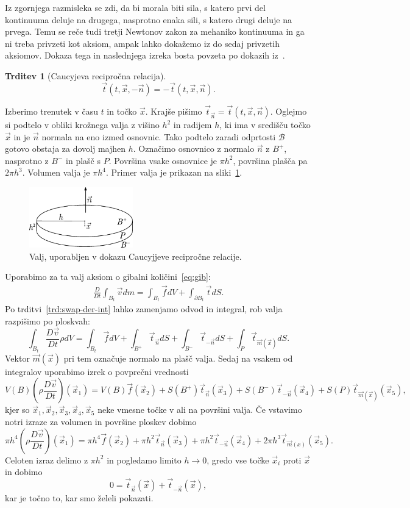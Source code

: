 \documentclass[a4paper,twoside]{article}
\theoremstyle{definition} %
\theoremstyle{plain} %
\newtheorem{trditev}[definicija]{Trditev}
\numberwithin{equation}{section}
\newcommand{\B}{\mathcal{B}}
\newcommand{\DD}[2]{\ensuremath{\frac{D #1}{D #2}}}
\newcommand{\DDt}[1]{\DD{#1}{t}}
\newcommand{\vv}{\vec{v}}
\newcommand{\vt}{\vec{t}}
\newcommand{\vn}{\vec{n}}
\newcommand{\vf}{\vec{f}}
\newcommand{\vm}{\vec{m}}
\newcommand{\vx}{\vec{x}}
\begin{document}
Iz zgornjega razmisleka se zdi, da bi morala biti sila, s katero prvi del
kontinuuma deluje na drugega, nasprotno enaka sili, s katero drugi deluje na
prvega. Temu se reče tudi tretji Newtonov zakon za mehaniko kontinuuma in
ga ni treba privzeti kot aksiom, ampak lahko dokažemo iz do sedaj
privzetih aksiomov. Dokaza tega in naslednjega izreka bosta povzeta po dokazih
iz~\cite[str.\ 104--107]{hjelmstad2007fundamentals}.
\begin{trditev}[Caucyjeva recipročna relacija]
  \label{trd:cauchy-reciprocal}
  \begin{equation}
    \vt(t, \vx, -\vn) = -\vt(t, \vx, \vn).
    \label{eq:cauchy-reciprocal}
  \end{equation}
\end{trditev}
\proof
Izberimo trenutek v času $t$ in točko $\vx$. Krajše pišimo $\vt_{\vn} = \vt(t, \vx,
\vn)$. Oglejmo si podtelo v obliki krožnega valja z višino $h^2$ in radijem $h$, ki ima
v središču točko $\vx$ in je $\vn$ normala na eno izmed osnovnic.
Tako podtelo zaradi odprtosti $\B$ gotovo obstaja za dovolj majhen $h$. Označimo
osnovnico z normalo $\vn$ z $B^+$, nasprotno z $B^-$ in plašč s $P$. Površina
vsake osnovnice je $\pi h^2$, površina plašča pa $2 \pi h^3$. Volumen valja je
$\pi h^4$. Primer valja je prikazan na sliki~\ref{fig:valj}.

\begin{figure}[h]
  \centering
  \includegraphics[width=0.4\textwidth]{images/cauchy_disc.pdf}
  \caption{Valj, uporabljen v dokazu Caucyjjeve recipročne relacije.}
  \label{fig:valj}
\end{figure}

Uporabimo za ta
valj aksiom o gibalni količini~\eqref{eq:gib}:
\begin{align*}
  \DDt{} \int_{B_t} \vv dm = \int_{B_t} \vf dV + \int_{\partial B_t} \vt dS.
\end{align*}
Po trditvi~\ref{trd:swap-der-int} lahko zamenjamo odvod in integral,  rob valja
razpišimo po ploskvah:
\[
  \int_{B_t} \DDt{\vv} \rho dV = \int_{B_t} \vf dV + \int_{B^+} \vt_{\vn} dS +
  \int_{B^-}\vt_{-\vn} dS + \int_{P} \vt_{\vm(\vx)}dS.
\]
Vektor $\vm(\vx)$ pri tem označuje normalo na plašč valja.
Sedaj na vsakem od integralov uporabimo izrek o povprečni vrednosti
\[
  V(B) (\rho\DDt{\vv})(\vx_1) = V(B) \vf(\vx_2) + S(B^+)\vt_{\vn}(\vx_3) +
  S(B^-)\vt_{-\vn}(\vx_4) + S(P)\vt_{\vm(\vx)}(\vx_5),
\]
kjer so $\vx_1, \vx_2, \vx_3, \vx_4, \vx_5$ neke vmesne točke v ali na površini valja.
Če vstavimo notri izraze za volumen in površine ploskev dobimo
\[
  \pi h^4 (\rho \DDt{\vv})(\vx_1) = \pi h^4 \vf(\vx_2) + \pi h^2 \vt_{\vn}(\vx_3) +
  \pi h^2 \vt_{-\vn}(\vx_4) + 2 \pi h^3 \vt_{\vm(x)}(\vx_5).
\]
Celoten izraz delimo z $\pi h^2$ in pogledamo limito $h\to 0$, gredo vse točke
$\vx_i$ proti $\vx$ in dobimo
\[
  0 = \vt_{\vn}(\vx) + \vt_{-\vn}(\vx),
\]
kar je točno to, kar smo želeli pokazati.
\endproof
\end{document}
